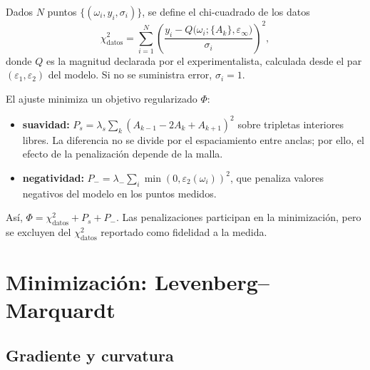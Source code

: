 Dados $N$ puntos $\{(\omega_i,y_i,\sigma_i)\}$, se define el chi-cuadrado de los datos
\begin{equation}
\label{eq:chi2}
\chi^{2}_{\mathrm{datos}}=\sum_{i=1}^{N}
\left(\frac{y_i-Q\bigl(\omega_i;\{A_k\},\varepsilon_\infty\bigr)}{\sigma_i}\right)^{2},
\end{equation}
donde $Q$ es la magnitud declarada por el experimentalista, calculada desde el par $(\varepsilon_1,\varepsilon_2)$ del modelo.
Si no se suministra error, $\sigma_i=1$.

El ajuste minimiza un objetivo regularizado $\Phi$:
\begin{itemize}[leftmargin=*]
\item \textbf{suavidad:} $P_s=\lambda_s\sum_k(A_{k-1}-2A_k+A_{k+1})^2$ sobre tripletas interiores libres. La diferencia no se divide por el espaciamiento entre anclas; por ello, el efecto de la penalizaci\'on depende de la malla.
\item \textbf{negatividad:} $P_-=\lambda_-\sum_i\min(0,\varepsilon_2(\omega_i))^2$, que penaliza valores negativos del modelo en los puntos medidos.
\end{itemize}
As\'i, $\Phi=\chi^{2}_{\mathrm{datos}}+P_s+P_-$. Las penalizaciones participan en la minimizaci\'on, pero se excluyen del $\chi^{2}_{\mathrm{datos}}$ reportado como fidelidad a la medida.


\chapter{Minimizaci\'on: Levenberg--Marquardt}
\label{ch:lm}

\section{Gradiente y curvatura}

